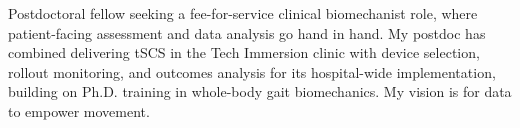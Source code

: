 \small{
Postdoctoral fellow seeking a fee-for-service clinical biomechanist role, where patient-facing assessment and data analysis go hand in hand. My postdoc has combined delivering tSCS in the Tech Immersion clinic with device selection, rollout monitoring, and outcomes analysis for its hospital-wide implementation, building on Ph.D. training in whole-body gait biomechanics. My vision is for data to empower movement.
}
